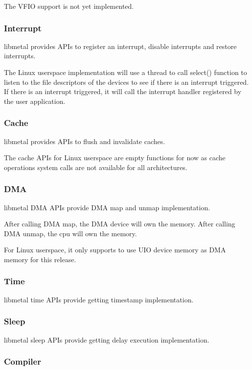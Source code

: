 The V\+F\+IO support is not yet implemented.

\subsubsection*{Interrupt}

libmetal provides A\+P\+Is to register an interrupt, disable interrupts and restore interrupts.

The Linux userspace implementation will use a thread to call select() function to listen to the file descriptors of the devices to see if there is an interrupt triggered. If there is an interrupt triggered, it will call the interrupt handler registered by the user application.

\subsubsection*{Cache}

libmetal provides A\+P\+Is to flush and invalidate caches.

The cache A\+P\+Is for Linux userspace are empty functions for now as cache operations system calls are not available for all architectures.

\subsubsection*{D\+MA}

libmetal D\+MA A\+P\+Is provide D\+MA map and unmap implementation.

After calling D\+MA map, the D\+MA device will own the memory. After calling D\+MA unmap, the cpu will own the memory.

For Linux userspace, it only supports to use U\+IO device memory as D\+MA memory for this release.

\subsubsection*{Time}

libmetal time A\+P\+Is provide getting timestamp implementation.

\subsubsection*{Sleep}

libmetal sleep A\+P\+Is provide getting delay execution implementation.

\subsubsection*{Compiler}

